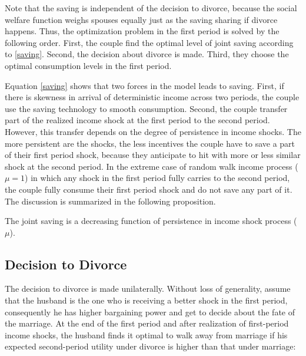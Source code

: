 Note that the saving is independent of the decision to divorce, because the social welfare function weighs spouses equally just as the saving sharing if divorce happens. Thus, the optimization problem in the first period is solved by the following order. First, the couple find the optimal level of joint saving according to \eqref{saving}. Second, the decision about divorce is made. Third, they choose the optimal consumption levels in the first period. \\

\begin{comment}
In fact, the order is as follows. In the first period they come up with optimal consumption and saving contingent on D. Then the husband using these contingents make decision and then after decision consumption-saving are pin down.
\end{comment}

Equation \eqref{saving} shows that two forces in the model leads to saving. First, if there is skewness in arrival of deterministic income across two periods, the couple use the saving technology to smooth consumption. Second, the couple transfer part of the realized income shock at the first period to the second period. However, this transfer depends on the degree of persistence in income shocks. The more persistent are the shocks, the less incentives the couple have to save a part of their first period shock, because they anticipate to hit with more or less similar shock at the second period. In the extreme case of random walk income process ($\mu = 1$) in which any shock in the first period fully carries to the second period, the couple fully consume their first period shock and do not save any part of it. The discussion is summarized in the following proposition.

\begin{prop}
 The joint saving is a decreasing function of persistence in income shock process ($\mu$). 
\end{prop}
 

\subsection{Decision to Divorce}
The decision to divorce is made unilaterally. Without loss of generality, assume that the husband is the one who is receiving a better shock in the first period, consequently he has higher bargaining power and get to decide about the fate of the marriage. At the end of the first period and after realization of first-period income shocks, the husband finds it optimal to walk away from marriage if his expected second-period utility under divorce is higher than that under marriage:

